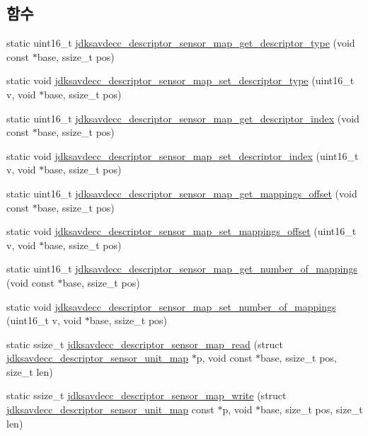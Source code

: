 \subsection*{함수}
\begin{DoxyCompactItemize}
\item 
static uint16\+\_\+t \hyperlink{group__descriptor__sensor__map_ga4784b203f4c06c4854ec6bf2d449eed7}{jdksavdecc\+\_\+descriptor\+\_\+sensor\+\_\+map\+\_\+get\+\_\+descriptor\+\_\+type} (void const $\ast$base, ssize\+\_\+t pos)
\item 
static void \hyperlink{group__descriptor__sensor__map_ga5b64c2dc771380835c64f8deee625df3}{jdksavdecc\+\_\+descriptor\+\_\+sensor\+\_\+map\+\_\+set\+\_\+descriptor\+\_\+type} (uint16\+\_\+t v, void $\ast$base, ssize\+\_\+t pos)
\item 
static uint16\+\_\+t \hyperlink{group__descriptor__sensor__map_gafad365d30993d11efe48a49ce1c49e40}{jdksavdecc\+\_\+descriptor\+\_\+sensor\+\_\+map\+\_\+get\+\_\+descriptor\+\_\+index} (void const $\ast$base, ssize\+\_\+t pos)
\item 
static void \hyperlink{group__descriptor__sensor__map_gaf17a3bc1ba205b94069539b5bb58d25d}{jdksavdecc\+\_\+descriptor\+\_\+sensor\+\_\+map\+\_\+set\+\_\+descriptor\+\_\+index} (uint16\+\_\+t v, void $\ast$base, ssize\+\_\+t pos)
\item 
static uint16\+\_\+t \hyperlink{group__descriptor__sensor__map_gac6e4f00abb9ae5f6e5fedf736cccd3b6}{jdksavdecc\+\_\+descriptor\+\_\+sensor\+\_\+map\+\_\+get\+\_\+mappings\+\_\+offset} (void const $\ast$base, ssize\+\_\+t pos)
\item 
static void \hyperlink{group__descriptor__sensor__map_ga5d57294a409fc4f3df74ffe82e9398f5}{jdksavdecc\+\_\+descriptor\+\_\+sensor\+\_\+map\+\_\+set\+\_\+mappings\+\_\+offset} (uint16\+\_\+t v, void $\ast$base, ssize\+\_\+t pos)
\item 
static uint16\+\_\+t \hyperlink{group__descriptor__sensor__map_ga41f4311304413d783b5c76da6ffd533f}{jdksavdecc\+\_\+descriptor\+\_\+sensor\+\_\+map\+\_\+get\+\_\+number\+\_\+of\+\_\+mappings} (void const $\ast$base, ssize\+\_\+t pos)
\item 
static void \hyperlink{group__descriptor__sensor__map_gaada6c4c8124ed75a7dab9fd9b58397cf}{jdksavdecc\+\_\+descriptor\+\_\+sensor\+\_\+map\+\_\+set\+\_\+number\+\_\+of\+\_\+mappings} (uint16\+\_\+t v, void $\ast$base, ssize\+\_\+t pos)
\item 
static ssize\+\_\+t \hyperlink{group__descriptor__sensor__map_ga84c9160d2779cd6d969aa6543a8329fe}{jdksavdecc\+\_\+descriptor\+\_\+sensor\+\_\+map\+\_\+read} (struct \hyperlink{structjdksavdecc__descriptor__sensor__unit__map}{jdksavdecc\+\_\+descriptor\+\_\+sensor\+\_\+unit\+\_\+map} $\ast$p, void const $\ast$base, ssize\+\_\+t pos, size\+\_\+t len)
\item 
static ssize\+\_\+t \hyperlink{group__descriptor__sensor__map_gaa6a7d0f61181c3601d20daf2c6c0e963}{jdksavdecc\+\_\+descriptor\+\_\+sensor\+\_\+map\+\_\+write} (struct \hyperlink{structjdksavdecc__descriptor__sensor__unit__map}{jdksavdecc\+\_\+descriptor\+\_\+sensor\+\_\+unit\+\_\+map} const $\ast$p, void $\ast$base, size\+\_\+t pos, size\+\_\+t len)
\end{DoxyCompactItemize}


